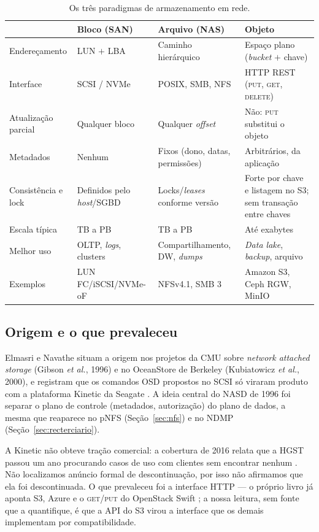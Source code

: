\documentclass[11pt,a4paper]{article}
\begin{document}
\begin{table}[H]
\centering
\caption{Os três paradigmas de armazenamento em rede.}
\label{tab:paradigmas}
{\footnotesize
\begin{tabular}{@{}L{2.6cm}L{3.6cm}L{3.8cm}L{4.6cm}@{}}
\toprule
 & \textbf{Bloco (SAN)} & \textbf{Arquivo (NAS)} & \textbf{Objeto} \\
\midrule
Endereçamento & LUN $+$ LBA & Caminho hierárquico & Espaço plano (\textit{bucket} $+$ chave) \\
Interface & SCSI / NVMe & POSIX, SMB, NFS & HTTP REST (\textsc{put}, \textsc{get}, \textsc{delete}) \\
Atualização parcial & Qualquer bloco & Qualquer \textit{offset} & Não: \textsc{put} substitui o objeto \\
Metadados & Nenhum & Fixos (dono, datas, permissões) & Arbitrários, da aplicação \\
Consistência e lock & Definidos pelo \textit{host}/SGBD & Locks/\textit{leases} conforme versão & Forte por chave e listagem no S3; sem transação entre chaves \cite{awss3consistency} \\
Escala típica & TB a PB & TB a PB & Até exabytes \\
Melhor uso & OLTP, \textit{logs}, clusters & Compartilhamento, DW, \textit{dumps} & \textit{Data lake}, \textit{backup}, arquivo \\
Exemplos & LUN FC/iSCSI/NVMe-oF & NFSv4.1, SMB 3 & Amazon S3, Ceph RGW, MinIO \\
\bottomrule
\end{tabular}}
\end{table}

\subsection{Origem e o que prevaleceu}

Elmasri e Navathe situam a origem nos projetos da CMU sobre \textit{network attached storage} (Gibson
\textit{et al.}, 1996) e no OceanStore de Berkeley (Kubiatowicz \textit{et al.}, 2000), e registram que os
comandos OSD propostos no SCSI só viraram produto com a plataforma Kinetic da Seagate \cite{elmasri2018}.
A ideia central do NASD de 1996 foi separar o plano de controle (metadados, autorização) do plano de
dados, a mesma que reaparece no pNFS (Seção~\ref{sec:nfs}) e no NDMP (Seção~\ref{sec:recterciario}).

A Kinetic não obteve tração comercial: a cobertura de 2016 relata que a HGST passou um ano procurando
casos de uso com clientes sem encontrar nenhum \cite{theregister2016}. Não localizamos anúncio formal de
descontinuação, por isso não afirmamos que ela foi descontinuada. O que prevaleceu foi a interface HTTP ---
o próprio livro já aponta S3, Azure e o \textsc{get}/\textsc{put} do OpenStack Swift \cite{elmasri2018}; a
nossa leitura, sem fonte que a quantifique, é que a API do S3 virou a interface que os demais implementam
por compatibilidade.
\end{document}
